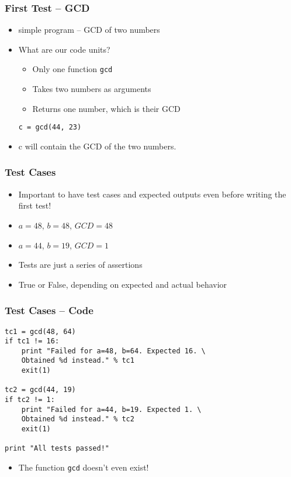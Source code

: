 \documentclass[12pt,presentation]{beamer}
\begin{document}
\begin{frame}[fragile]
  \frametitle{First Test -- GCD}
  \begin{itemize}
  \item simple program -- GCD of two numbers
  \item What are our code units?
    \begin{itemize}
    \item Only one function \texttt{gcd}
    \item Takes two numbers as arguments
    \item Returns one number, which is their GCD
    \end{itemize}
\begin{lstlisting}
c = gcd(44, 23)
\end{lstlisting}
  \item c will contain the GCD of the two numbers.
  \end{itemize}
\end{frame}

\begin{frame}[fragile]
  \frametitle{Test Cases}
  \begin{itemize}
  \item Important to have test cases and expected outputs even before
    writing the first test!
  \item $a=48$, $b=48$, $GCD=48$
  \item $a=44$, $b=19$, $GCD=1$
  \item Tests are just a series of assertions
  \item True or False, depending on expected and actual behavior
  \end{itemize}

\end{frame}

\begin{frame}[fragile]
  \frametitle{Test Cases -- Code}
\begin{lstlisting}
tc1 = gcd(48, 64)
if tc1 != 16:
    print "Failed for a=48, b=64. Expected 16. \
    Obtained %d instead." % tc1
    exit(1)

tc2 = gcd(44, 19)
if tc2 != 1:
    print "Failed for a=44, b=19. Expected 1. \
    Obtained %d instead." % tc2
    exit(1)

print "All tests passed!"
\end{lstlisting}
\begin{itemize}
\item The function \texttt{gcd} doesn't even exist!
\end{itemize}
\end{frame}
\end{document}
